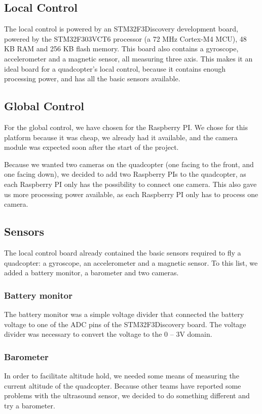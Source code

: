 \documentclass[11pt, a4paper, onecolumn, oneside, parskip=half]{scrartcl}
\begin{document}
\subsection{Local Control}
\label{sec:arch:local}
The local control is powered by an STM32F3Discovery development board, powered by the STM32F303VCT6 processor (a 72 MHz Cortex-M4 MCU), 48 KB RAM and 256 KB flash memory. This board also contains a gyroscope, accelerometer and a magnetic sensor, all measuring three axis. This makes it an ideal board for a quadcopter's local control, because it contains enough processing power, and has all the basic sensors available.

\subsection{Global Control}
\label{sec:arch:global}
For the global control, we have chosen for the Raspberry PI. We chose for this platform because it was cheap, we already had it available, and the camera module was expected soon after the start of the project.

Because we wanted two cameras on the quadcopter (one facing to the front, and one facing down), we decided to add two Raspberry PIs to the quadcopter, as each Raspberry PI only has the possibility to connect one camera. This also gave us more processing power available, as each Raspberry PI only has to process one camera.

\subsection{Sensors}
\label{sec:arch:sensors}
The local control board already contained the basic sensors required to fly a quadcopter: a gyroscope, an accelerometer and a magnetic sensor. To this list, we added a battery monitor, a barometer and two cameras.

\subsubsection{Battery monitor}
\label{sec:arch:sensors:battery}
The battery monitor was a simple voltage divider that connected the battery voltage to one of the ADC pins of the STM32F3Discovery board. The voltage divider was necessary to convert the voltage to the 0 -- 3V domain.

\subsubsection{Barometer}
\label{sec:arch:sensors:batometer}
In order to facilitate altitude hold, we needed some means of measuring the current altitude of the quadcopter. Because other teams have reported some problems with the ultrasound sensor, we decided to do something different and try a barometer.
\end{document}
